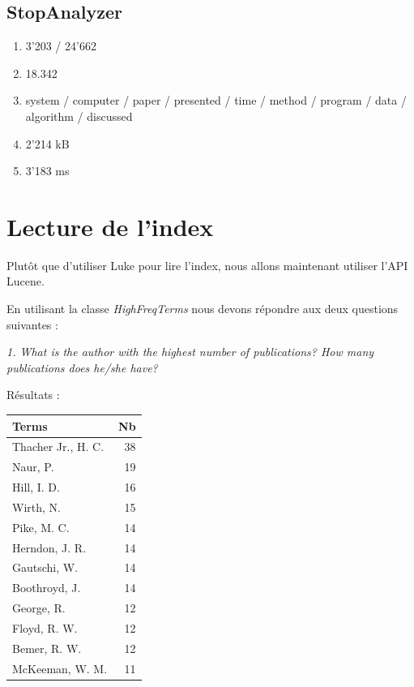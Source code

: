 \subsection{StopAnalyzer}
\begin{enumerate}
    \item 3'203 / 24'662
    \item 18.342
    \item system / computer / paper / presented / time / method / program / data / algorithm / discussed
    \item 2'214 kB
    \item 3'183 ms
\end{enumerate}

\section{Lecture de l'index}

Plutôt que d'utiliser Luke pour lire l'index, nous allons maintenant utiliser l'API Lucene. 

En utilisant la classe \textit{HighFreqTerms} nous devons répondre aux deux questions suivantes :

\textit{1. What is the author with the highest number of publications? How many publications does he/she have?}

Résultats :

\begin{center}
    \begin{tabular}{|l|r|}
      \hline
      Terms & Nb \\
      \hline
      Thacher Jr., H. C. & 38 \\
      Naur, P. & 19 \\
      Hill, I. D. & 16 \\
      Wirth, N. & 15 \\
      Pike, M. C. & 14 \\
      Herndon, J. R. & 14 \\
      Gautschi, W. & 14 \\
      Boothroyd, J. & 14 \\
      George, R. & 12 \\
      Floyd, R. W. & 12 \\
      Bemer, R. W. & 12 \\
      McKeeman, W. M. & 11 \\
      \hline
    \end{tabular}
\end{center}

